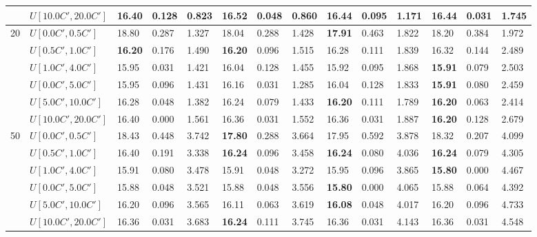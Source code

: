 \begin{table}[h]
{\begin{tabular}{|l|l||l|l|l||l|l|l||l|l|l||l|l|l|}
       & $U[10.0C',20.0C']$ & \textbf{16.40} & 0.128 & 0.823 & 16.52 & 0.048 & 0.860 & 16.44 & 0.095 & 1.171 & 16.44 & 0.031 & 1.745 \\
      \hline\hline
      \multirow{6}{*}{20} & $U[0.0C',0.5C']$ & 18.80 & 0.287 & 1.327 & 18.04 & 0.288 & 1.428 & \textbf{17.91} & 0.463 & 1.822 & 18.20 & 0.384 & 1.972 \\
       & $U[0.5C',1.0C']$ & \textbf{16.20} & 0.176 & 1.490 & \textbf{16.20} & 0.096 & 1.515 & 16.28 & 0.111 & 1.839 & 16.32 & 0.144 & 2.489 \\
       & $U[1.0C',4.0C']$ & 15.95 & 0.031 & 1.421 & 16.04 & 0.128 & 1.455 & 15.92 & 0.095 & 1.868 & \textbf{15.91} & 0.079 & 2.503 \\
       & $U[0.0C',5.0C']$ & 15.95 & 0.096 & 1.431 & 16.16 & 0.031 & 1.285 & 16.04 & 0.128 & 1.833 & \textbf{15.91} & 0.080 & 2.459 \\
       & $U[5.0C',10.0C']$ & 16.28 & 0.048 & 1.382 & 16.24 & 0.079 & 1.433 & \textbf{16.20} & 0.111 & 1.789 & \textbf{16.20} & 0.063 & 2.414 \\
       & $U[10.0C',20.0C']$ & 16.40 & 0.000 & 1.561 & 16.36 & 0.031 & 1.552 & 16.36 & 0.031 & 1.887 & \textbf{16.20} & 0.128 & 2.679 \\
      \hline\hline
      \multirow{6}{*}{50} & $U[0.0C',0.5C']$ & 18.43 & 0.448 & 3.742 & \textbf{17.80} & 0.288 & 3.664 & 17.95 & 0.592 & 3.878 & 18.32 & 0.207 & 4.099 \\
       & $U[0.5C',1.0C']$ & 16.40 & 0.191 & 3.338 & \textbf{16.24} & 0.096 & 3.458 & \textbf{16.24} & 0.080 & 4.036 & \textbf{16.24} & 0.079 & 4.305 \\
       & $U[1.0C',4.0C']$ & 15.91 & 0.080 & 3.478 & 15.91 & 0.048 & 3.272 & 15.95 & 0.096 & 3.865 & \textbf{15.80} & 0.000 & 4.467 \\
       & $U[0.0C',5.0C']$ & 15.88 & 0.048 & 3.521 & 15.88 & 0.048 & 3.556 & \textbf{15.80} & 0.000 & 4.065 & 15.88 & 0.064 & 4.392 \\
       & $U[5.0C',10.0C']$ & 16.20 & 0.096 & 3.565 & 16.11 & 0.063 & 3.619 & \textbf{16.08} & 0.048 & 4.017 & 16.20 & 0.096 & 4.733 \\
       & $U[10.0C',20.0C']$ & 16.36 & 0.031 & 3.683 & \textbf{16.24} & 0.111 & 3.745 & 16.36 & 0.031 & 4.143 & 16.36 & 0.031 & 4.548 \\
      \hline
      \end{tabular}
      }
      \label{tab:pcpn90p9}\end{table}


